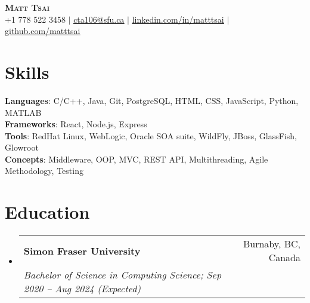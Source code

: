 \documentclass[letterpaper,11pt]{article}
\makeatletter
\newcommand{\resumeSubheading}[4]{
  \vspace{-2pt}\item
    \begin{tabular*}{0.97\textwidth}[t]{l@{\extracolsep{\fill}}r}
      \textbf{#1} & #2 \\
      \textit{\small#3} & \textit{\small #4} \\
    \end{tabular*}\vspace{-7pt}
}
\newcommand{\resumeSubHeadingListStart}{\begin{itemize}[leftmargin=0.15in, label={}]}
\newcommand{\resumeSubHeadingListEnd}{\end{itemize}}
\makeatother
\begin{document}

\begin{center}
    \textbf{\Huge \scshape Matt Tsai} \\ \vspace{1pt}
    \small +1 778 522 3458 $|$ \href{mailto:cta106@sfu.ca}{\underline{cta106@sfu.ca}} $|$ 
    \href{https://www.linkedin.com/in/matt-tsai-90a3291a3/}{\underline{linkedin.com/in/matttsai}} $|$ 
    \href{https://github.com/asd881018}{\underline{github.com/matttsai}}
\end{center}

\section{Skills}
 \begin{itemize}[leftmargin=0.15in, label={}]
    \small{\item{
     \textbf{Languages}{: C/C++, Java, Git, PostgreSQL, HTML, CSS, JavaScript, Python, MATLAB} \\
     \textbf{Frameworks}{: React, Node.js, Express} \\
     \textbf{Tools}{: RedHat Linux, WebLogic, Oracle SOA suite, WildFly, JBoss, GlassFish, Glowroot} \\
     \textbf{Concepts}{: Middleware, OOP, MVC, REST API, Multithreading, Agile Methodology, Testing}
    }}
 \end{itemize}


\section{Education}
  \resumeSubHeadingListStart
    \resumeSubheading
      {Simon Fraser University}{Burnaby, BC, Canada}
      {Bachelor of Science in Computing Science; Sep 2020 -- Aug 2024 (Expected)}{}
  \resumeSubHeadingListEnd

\end{document}
